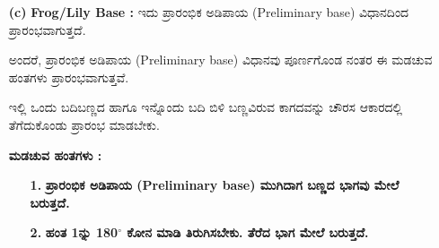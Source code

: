 \begin{enumerate}
\item[{\bf (c)}]  \textbf{Frog/Lily Base :} ಇದು ಪ್ರಾರಂಭಿಕ ಅಡಿಪಾಯ (Preliminary base) ವಿಧಾನದಿಂದ ಪ್ರಾರಂಭವಾಗುತ್ತದೆ.
\begin{figure}[H]
\end{figure}

ಅಂದರೆ, ಪ್ರಾರಂಭಿಕ ಅಡಿಪಾಯ (Preliminary base) ವಿಧಾನವು ಪೂರ್ಣಗೊಂಡ ನಂತರ ಈ ಮಡಚುವ ಹಂತಗಳು ಪ್ರಾರಂಭವಾಗುತ್ತವೆ.

ಇಲ್ಲಿ ಒಂದು ಬದಿಬಣ್ಣದ ಹಾಗೂ ಇನ್ನೊಂದು ಬದಿ ಬಿಳಿ ಬಣ್ಣವಿರುವ ಕಾಗದವನ್ನು ಚೌರಸ ಆಕಾರದಲ್ಲಿ ತೆಗೆದುಕೊಂಡು ಪ್ರಾರಂಭ ಮಾಡಬೇಕು.

\medskip
\noindent
\textbf{ಮಡಚುವ ಹಂತಗಳು :}
\begin{itemize}
\item[{\bf 1.}] \textbf{ಪ್ರಾರಂಭಿಕ ಅಡಿಪಾಯ (Preliminary base) ಮುಗಿದಾಗ ಬಣ್ಣದ ಭಾಗವು ಮೇಲೆ ಬರುತ್ತದೆ.}

\item[{\bf 2.}] \textbf{ಹಂತ 1ನ್ನು 180$^{\circ}$ ಕೋನ ಮಾಡಿ ತಿರುಗಿಸಬೇಕು. ತೆರೆದ ಭಾಗ ಮೇಲೆ ಬರುತ್ತದೆ.}
\begin{figure}[H]
\end{figure}


\end{itemize}
\end{enumerate}
